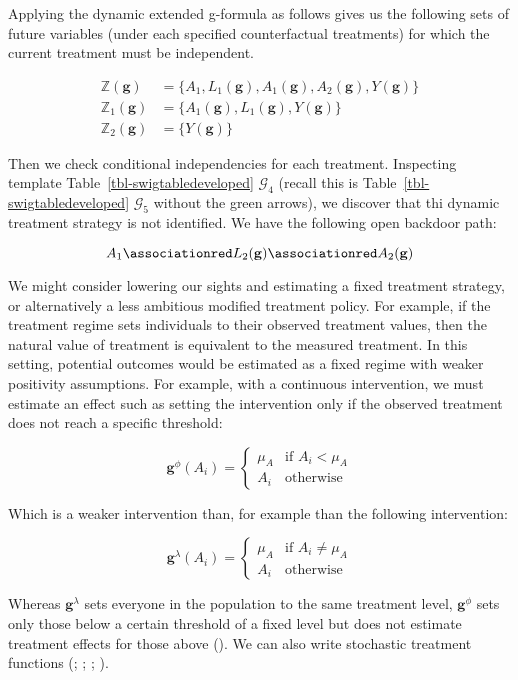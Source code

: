 \documentclass[
  single column]{article}
\begin{document}
Applying the dynamic extended g-formula as follows gives us the
following sets of future variables (under each specified counterfactual
treatments) for which the current treatment must be independent.

\[
\begin{aligned}
\mathbb{Z}(\mathbf{g}) &= \{A_1, L_1(\mathbf{g}), A_1(\mathbf{g}), A_2(\mathbf{g}), Y(\mathbf{g})\} \\
\mathbb{Z}_1(\mathbf{g}) &= \{A_1(\mathbf{g}), L_1(\mathbf{g}), Y(\mathbf{g})\} \\
\mathbb{Z}_2(\mathbf{g}) &= \{Y(\mathbf{g})\}
\end{aligned}
\]

Then we check conditional independencies for each treatment. Inspecting
template Table~\ref{tbl-swigtabledeveloped} \(\mathcal{G}_4\) (recall
this is Table~\ref{tbl-swigtabledeveloped} \(\mathcal{G}_5\) without the
green arrows), we discover that thi dynamic treatment strategy is not
identified. We have the following open backdoor path:

\[
A_1 \associationred L_2(\mathbf{g}) \associationred A_2(\mathbf{g})
\]

We might consider lowering our sights and estimating a fixed treatment
strategy, or alternatively a less ambitious modified treatment policy.
For example, if the treatment regime sets individuals to their observed
treatment values, then the natural value of treatment is equivalent to
the measured treatment. In this setting, potential outcomes would be
estimated as a fixed regime with weaker positivity assumptions. For
example, with a continuous intervention, we must estimate an effect such
as setting the intervention only if the observed treatment does not
reach a specific threshold:

\[
\mathbf{g}^\phi (A_i) = \begin{cases}  \mu_A & \text{if } A_i < \mu_A \\ 
A_i & \text{otherwise} \end{cases}
\]

Which is a weaker intervention than, for example than the following
intervention:

\[
\mathbf{g}^\lambda (A_i) = \begin{cases}   \mu_A  & \text{if } A_i \neq \mu_A   \\ 
A_i & \text{otherwise} \end{cases}
\]

Whereas \(\mathbf{g}^\lambda\) sets everyone in the population to the
same treatment level, \(\mathbf{g}^\phi\) sets only those below a
certain threshold of a fixed level but does not estimate treatment
effects for those above (). We can also write stochastic treatment functions
(;
;
;
).
\end{document}
